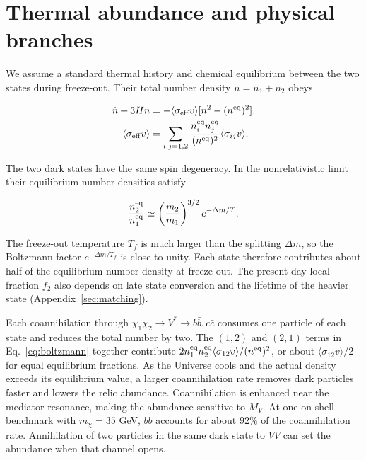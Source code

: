 \documentclass[aps,prd,reprint,superscriptaddress,longbibliography,floatfix]{revtex4-2}
\begin{document}
\section{Thermal abundance and physical branches}
\label{sec:abundance}

We assume a standard thermal history and chemical equilibrium between the two states during freeze-out. Their total number density $n=n_1+n_2$ obeys

\begin{equation}
\label{eq:boltzmann}
\begin{aligned}
\dot n+3Hn&=-\langle\sigma_{\rm eff}v\rangle[n^2-(n^{\rm eq})^2],\\
\langle\sigma_{\rm eff}v\rangle
&=\sum_{i,j=1,2}\frac{n_i^{\rm eq}n_j^{\rm eq}}{(n^{\rm eq})^2}\langle\sigma_{ij}v\rangle .
\end{aligned}
\end{equation}

The two dark states have the same spin degeneracy. In the nonrelativistic limit their equilibrium number densities satisfy

\begin{equation*}
\frac{n_2^{\rm eq}}{n_1^{\rm eq}}\simeq\left(\frac{m_2}{m_1}\right)^{3/2}e^{-\Delta m/T}.
\end{equation*}

The freeze-out temperature $T_f$ is much larger than the splitting $\Delta m$, so the Boltzmann factor $e^{-\Delta m/T_f}$ is close to unity. Each state therefore contributes about half of the equilibrium number density at freeze-out. The present-day local fraction $f_2$ also depends on late state conversion and the lifetime of the heavier state (Appendix~\ref{sec:matching}).

Each coannihilation through $\chi_1\chi_2\to V^*\to b\bar b,c\bar c$ consumes one particle of each state and reduces the total number by two. The $(1,2)$ and $(2,1)$ terms in Eq.~\eqref{eq:boltzmann} together contribute $2n_1^{\rm eq}n_2^{\rm eq}\langle\sigma_{12}v\rangle/(n^{\rm eq})^2$, or about $\langle\sigma_{12}v\rangle/2$ for equal equilibrium fractions. As the Universe cools and the actual density exceeds its equilibrium value, a larger coannihilation rate removes dark particles faster and lowers the relic abundance. Coannihilation is enhanced near the mediator resonance, making the abundance sensitive to $M_V$. At one on-shell benchmark with $m_\chi=35$ GeV, $b\bar b$ accounts for about $92\%$ of the coannihilation rate. Annihilation of two particles in the same dark state to $VV$ can set the abundance when that channel opens. \cite{griest1991,gondolo1991}
\end{document}
